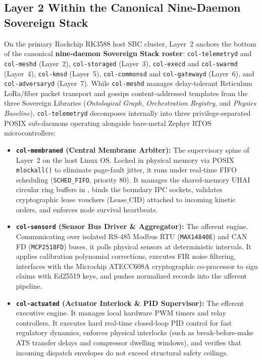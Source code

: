 \subsection{Layer 2 Within the Canonical Nine-Daemon Sovereign Stack}

On the primary Rockchip RK3588 host SBC cluster, Layer~2 anchors the bottom of the canonical \textbf{nine-daemon Sovereign Stack roster}: \texttt{col-telemetryd} and \texttt{col-meshd} (Layer~2), \texttt{col-storaged} (Layer~3), \texttt{col-execd} and \texttt{col-swarmd} (Layer~4), \texttt{col-kmsd} (Layer~5), \texttt{col-commonsd} and \texttt{col-gatewayd} (Layer~6), and \texttt{col-adversaryd} (Layer~7). While \texttt{col-meshd} manages delay-tolerant Reticulum LoRa/fiber packet transport and gossips content-addressed templates from the three Sovereign Libraries (\textit{Ontological Graph}, \textit{Orchestration Registry}, and \textit{Physics Baseline}), \texttt{col-telemetryd} decomposes internally into three privilege-separated POSIX sub-daemons operating alongside bare-metal Zephyr RTOS microcontrollers:

\begin{itemize}
    \item \textbf{\texttt{col-membraned} (Central Membrane Arbiter):} The supervisory spine of Layer~2 on the host Linux OS. Locked in physical memory via POSIX \texttt{mlockall()} to eliminate page-fault jitter, it runs under real-time FIFO scheduling (\texttt{SCHED\_FIFO}, priority 80). It manages the shared-memory UHAI circular ring buffers in , binds the boundary IPC sockets, validates cryptographic lease vouchers ($\mathrm{Lease\_CID}$) attached to incoming kinetic orders, and enforces node survival heartbeats.
    \item \textbf{\texttt{col-sensord} (Sensor Bus Driver \& Aggregator):} The afferent engine. Communicating over isolated RS-485 Modbus RTU (\texttt{MAX14840E}) and CAN FD (\texttt{MCP2518FD}) buses, it polls physical sensors at deterministic intervals. It applies calibration polynomial corrections, executes FIR noise filtering, interfaces with the Microchip ATECC608A cryptographic co-processor to sign claims with Ed25519 keys, and pushes normalized records into the afferent pipeline.
    \item \textbf{\texttt{col-actuated} (Actuator Interlock \& PID Supervisor):} The efferent executive engine. It manages local hardware PWM timers and relay controllers. It executes hard real-time closed-loop PID control for fast regulatory dynamics, enforces physical interlocks (such as break-before-make ATS transfer delays and compressor dwelling windows), and verifies that incoming dispatch envelopes do not exceed structural safety ceilings.
\end{itemize}

